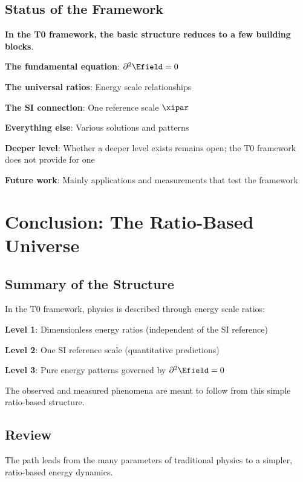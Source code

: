 	\subsection{Status of the Framework}
	
	\begin{tcolorbox}[colback=yellow!5!white,colframe=orange!75!black,title=Basic Structure in the T0 Framework]
		\textbf{In the T0 framework, the basic structure reduces to a few building blocks}.
		
		\textbf{The fundamental equation}: $\partial^2 \Efield = 0$
		
		\textbf{The universal ratios}: Energy scale relationships
		
		\textbf{The SI connection}: One reference scale $\xipar$
		
		\textbf{Everything else}: Various solutions and patterns
		
		\textbf{Deeper level}: Whether a deeper level exists remains open; the T0 framework does not provide for one
		
		\textbf{Future work}: Mainly applications and measurements that test the framework
	\end{tcolorbox}
	
	\section{Conclusion: The Ratio-Based Universe}
	
	\subsection{Summary of the Structure}
	
	In the T0 framework, physics is described through energy scale ratios:
	
	\textbf{Level 1}: Dimensionless energy ratios (independent of the SI reference)
	
	\textbf{Level 2}: One SI reference scale (quantitative predictions)
	
	\textbf{Level 3}: Pure energy patterns governed by $\partial^2 \Efield = 0$
	
	The observed and measured phenomena are meant to follow from this simple ratio-based structure.
	
	\subsection{Review}
	
	The path leads from the many parameters of traditional physics to a simpler, ratio-based energy dynamics.
	

